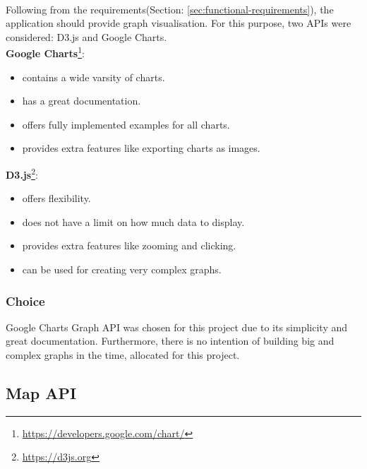 \documentclass{l4proj}
\begin{document}
\paragraph{}
Following from the requirements(Section: \ref{sec:functional-requirements}), the application should provide graph visualisation. For this purpose, two APIs were considered: D3.js and Google Charts.  
\\\hspace*{7mm}\textbf{Google Charts}\footnote{\url{https://developers.google.com/chart/}}:
\begin{multicols}{2}
	\begin{itemize}[noitemsep]
		\item contains a wide varsity of charts.
		\item has a great documentation.
		\item offers fully implemented examples for all charts. 
		\item provides extra features like exporting charts as images.
	\end{itemize} 
\end{multicols}
\textbf{D3.js}\footnote{\url{https://d3js.org}}:
\begin{multicols}{2}
	\begin{itemize}[noitemsep]
		\item offers flexibility.
		\item does not have a limit on how much data to display.
		\item provides extra features like zooming and clicking.
		\item can be used for creating very complex graphs.
	\end{itemize} 
\end{multicols}
\subsubsection{Choice}
Google Charts Graph API was chosen for this project due to its simplicity and great documentation. Furthermore, there is no intention of building big and complex graphs in the time, allocated for this project.  

\subsection{Map API}
\end{document}
